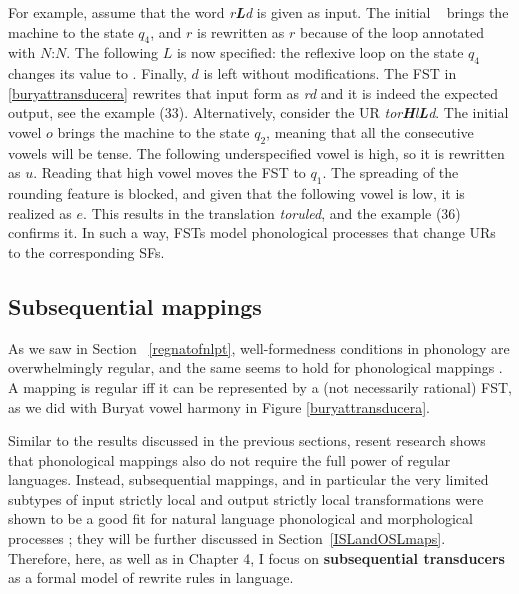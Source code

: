 For example, assume that the word \emph{\textopeno r\textbf{L}d} is given as input.
The initial \textopeno~ brings the machine to the state $q_4$, and $r$ is rewritten as $r$ because of the loop annotated with $N$:$N$.
The following $L$ is now specified: the reflexive loop on the state $q_4$ changes its value to \textopeno.
Finally, $d$ is left without modifications.
The FST in \ref{buryattransducera} rewrites that input form as \emph{\textopeno r\textopeno d} and it is indeed the expected output, see the example (33).
Alternatively, consider the UR \emph{tor\textbf{H}l\textbf{L}d}.
The initial vowel $o$ brings the machine to the state $q_2$, meaning that all the consecutive vowels will be tense.
The following underspecified vowel is high, so it is rewritten as $u$.
Reading that high vowel moves the FST to $q_1$.
The spreading of the rounding feature is blocked, and given that the following vowel is low, it is realized as $e$.
This results in the translation \emph{toruled}, and the example (36) confirms it.
In such a way, FSTs model phonological processes that change URs to the corresponding SFs.





\subsection{Subsequential mappings}
\label{RussianWFDFST}

As we saw in Section~ \ref{regnatofnlpt}, well-formedness conditions in phonology are overwhelmingly regular, and the same seems to hold for phonological mappings \citep{Johnson1972,Koskenniemi1983,KaplanKay94}.
A mapping is regular iff it can be represented by a (not necessarily rational) FST\@, as we did with Buryat vowel harmony in Figure \ref{buryattransducera}.


Similar to the results discussed in the previous sections, resent research shows that phonological mappings also do not require the full power of regular languages.
Instead, subsequential mappings, and in particular the very limited subtypes of input strictly local and output strictly local transformations were shown to be a good fit for natural language phonological and morphological processes \citep{Chandlee2014,ChandleeHeinz2018}; they will be further discussed in Section~\ref{ISLandOSLmaps}.
Therefore, here, as well as in Chapter 4, I focus on \textbf{subsequential transducers} as a formal model of rewrite rules in language.

